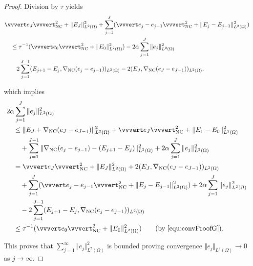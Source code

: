 \begin{proof}
  \noindent Division by $\tau$ yields
  \begin{align}
    \label{equ:convProofG}
    &\vvvert e_J \vvvert^2_\nc +\Vert E_J \Vert_{L^2(\Omega)}^2 
    +\sum_{j=1}^J(\vvvert e_j-e_{j-1} \vvvert_\nc^2 + 
    \Vert E_j-E_{j-1}\Vert_{L^2(\Omega)}^2) \notag\\
    &\quad \leq 
    \tau^{-1}(\vvvert e_0 \vvvert_\nc^2 + \Vert E_0 \Vert_{L^2(\Omega)}^2 )
    -2\alpha\sum_{j=1}^J \Vert e_j\Vert^2_{L^2(\Omega)} \\
    &\quad\quad
    2 
    \sum_{j=1}^{J-1} 
    (E_{j+1}-E_j,\gradnc(e_j-e_{j-1}))_{L^2(\Omega)}
    -2(E_J,\gradnc(e_J-e_{J-1}))_{L^2(\Omega)}.\notag
  \end{align}


  \noindent which implies
  \begin{align*}
    &2\alpha\sum_{j=1}^J\Vert e_j\Vert^2_{L^2(\Omega)} \\
    &\quad\leq
    \Vert E_J + \gradnc(e_J-e_{J-1}) \Vert_{L^2(\Omega)}^2 
    + \vvvert e_J \vvvert^2_\nc 
    + \Vert E_1 - E_0 \Vert^2_{L^2(\Omega)} \\
    &\quad\quad 
    + \sum_{j=1}^{J-1}  
      \Vert \gradnc(e_j-e_{j-1}) - (E_{j+1} - E_j ) \Vert^2_{L^2(\Omega)} 
    + 2\alpha\sum_{j=1}^J\Vert e_j\Vert^2_{L^2(\Omega)}\\
    &\quad = 
    \vvvert e_J \vvvert^2_\nc + \Vert E_J \Vert_{L^2(\Omega)}^2 
    + 2(E_{J},\gradnc(e_J-e_{J-1}))_{L^2(\Omega)} \\
    &\quad\quad 
    + \sum_{j=1}^J ( \vvvert e_j-e_{j-1} \vvvert^2_\nc
    + \Vert E_j - E_{j-1} \Vert^2_{L^2(\Omega)} )
    + 2\alpha\sum_{j=1}^J\Vert e_j\Vert^2_{L^2(\Omega)}\\
    &\quad\quad 
    - 2\sum_{j=1}^{J-1}(E_{j+1}-E_j,\gradnc(e_j-e_{j-1}))_{L^2(\Omega)}\\
    &\quad\leq
    \tau^{-1}(\vvvert e_0\vvvert^2_\nc + \Vert E_0\Vert^2_{L^2(\Omega)})
    \tag{by \eqref{equ:convProofG}}.
  \end{align*}

  This proves that 
  $\sum_{j=1}^\infty \Vert e_j\Vert _{L^2(\Omega)}^2$ is bounded
  proving convergence $\Vert e_j\Vert_{L^2(\Omega)}\rightarrow 0$
  as $j\rightarrow \infty$.
\end{proof}


